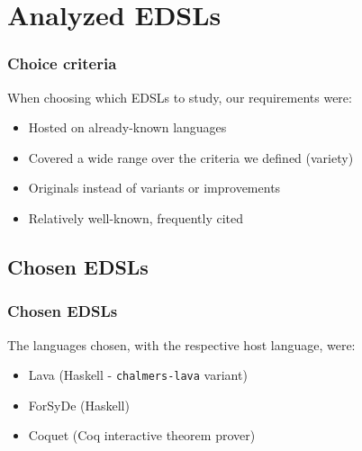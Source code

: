 \section{Analyzed EDSLs}
\label{sec:analyzed-edsls}
    \frame{\sectionpage}

    \begin{frame}
        \frametitle{Choice criteria}

        \par{When choosing which EDSLs to study, our requirements were:}
        \vspace{0.3cm}
        \begin{itemize}
            \item Hosted on already-known languages
            \item Covered a wide range over the criteria we defined (variety)
            \item Originals instead of variants or improvements
            \item Relatively well-known, frequently cited
        \end{itemize}
    \end{frame}


    \subsection{Chosen EDSLs}
    \label{subsec:chosen-edsls}
        \begin{frame}
            \frametitle{Chosen EDSLs}
            \par{The languages chosen, with the respective host language, were:}
            \vspace{0.3cm}
            \begin{itemize}
                \item Lava (Haskell - \texttt{chalmers-lava} variant)
                \item ForSyDe (Haskell)
                \item Coquet (Coq interactive theorem prover)
            \end{itemize}
        \end{frame}

